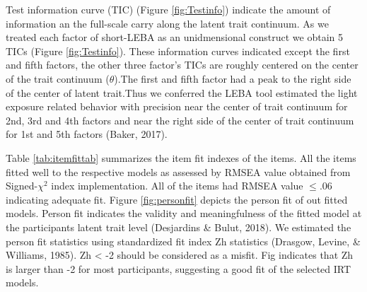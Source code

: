 \documentclass[
  english,
  man]{apa6}
\begin{document}
Test information curve (TIC) (Figure \ref{fig:Testinfo}) indicate the amount of information an the full-scale carry along the latent trait continuum. As we treated each factor of short-LEBA as an unidmensional construct we obtain 5 TICs (Figure \ref{fig:Testinfo}). These information curves indicated except the first and fifth factors, the other three factor's TICs are roughly centered on the center of the trait continuum (\(\theta\)).The first and fifth factor had a peak to the right side of the center of latent trait.Thus we conferred the LEBA tool estimated the light exposure related behavior with precision near the center of trait continuum for 2nd, 3rd and 4th factors and near the right side of the center of trait continuum for 1st and 5th factors (Baker, 2017).

Table \ref{tab:itemfittab} summarizes the item fit indexes of the items. All the items fitted well to the respective models as assessed by RMSEA value obtained from Signed-\(\chi^2\) index implementation. All of the items had RMSEA value \(\le\).06 indicating adequate fit. Figure \ref{fig:personfit} depicts the person fit of out fitted models. Person fit indicates the validity and meaningfulness of the fitted model at the participants latent trait level (Desjardins \& Bulut, 2018). We estimated the person fit statistics using standardized fit index Zh statistics (Drasgow, Levine, \& Williams, 1985). Zh \textless{} -2 should be considered as a misfit. Fig indicates that Zh is larger than -2 for most participants, suggesting a good fit of the selected IRT models.
\end{document}

